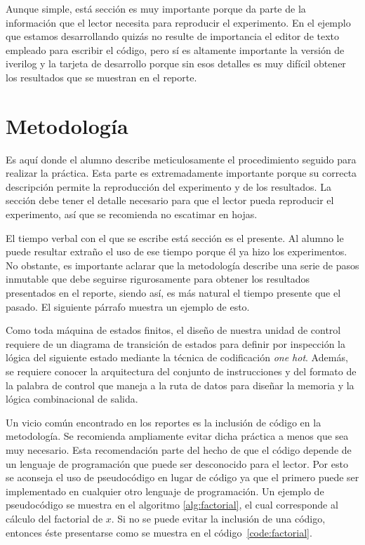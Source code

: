 \documentclass[12pt]{article}
\begin{document}
Aunque simple, está sección es muy importante porque da parte de la información 
que el lector necesita para reproducir el experimento. En el ejemplo que estamos 
desarrollando quizás no resulte de importancia el editor de texto empleado para 
escribir el código, pero sí es altamente importante la versión de iverilog y la 
tarjeta de desarrollo porque sin esos detalles es muy difícil obtener los 
resultados que se muestran en el reporte.

\section{Metodología}\label{sec:methodology}

Es aquí donde el alumno describe meticulosamente el procedimiento seguido para 
realizar la práctica. Esta parte es extremadamente importante porque su correcta 
descripción permite la reproducción del experimento y de los resultados. La 
sección debe tener el detalle necesario para que el lector pueda reproducir el 
experimento, así que se recomienda no escatimar en hojas.

El tiempo verbal con el que se escribe está sección es el presente. Al alumno 
le puede resultar extraño el uso de ese tiempo porque él ya hizo los 
experimentos. No obstante, es importante aclarar que la metodología describe 
una serie de pasos inmutable que debe seguirse rigurosamente para obtener los 
resultados presentados en el reporte, siendo así, es más natural el tiempo 
presente que el pasado. El siguiente párrafo muestra un ejemplo de esto.

Como toda máquina de estados finitos, el diseño de nuestra unidad de control 
requiere de un diagrama de transición de estados para definir
por inspección la lógica del siguiente estado mediante la técnica de 
codificación \textit{one hot}. Además, se requiere conocer la arquitectura del 
conjunto de instrucciones y del formato de la palabra de control que maneja a
la ruta de datos para diseñar la memoria y la lógica combinacional de salida.

Un vicio común encontrado en los reportes es la inclusión de código en la 
metodología. Se recomienda ampliamente evitar dicha práctica a menos que sea 
muy necesario. Esta recomendación parte del hecho de que el código depende de 
un lenguaje de programación que puede ser desconocido para el lector. Por esto 
se aconseja el uso de pseudocódigo en lugar de código ya que el primero puede 
ser implementado en cualquier otro lenguaje de programación. Un ejemplo de 
pseudocódigo se muestra en el algoritmo \ref{alg:factorial}, el cual 
corresponde al cálculo del factorial de $x$. Si no se puede evitar la 
inclusión de una código, entonces éste presentarse como se muestra en el 
código~\ref{code:factorial}.
\end{document}
